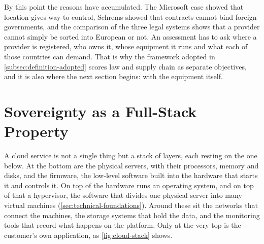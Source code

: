 By this point the reasons have accumulated. The Microsoft case showed that
location gives way to control, Schrems showed that contracts cannot bind foreign
governments, and the comparison of the three legal systems shows that a provider
cannot simply be sorted into European or not. An assessment has to ask where a
provider is registered, who owns it, whose equipment it runs and what each of those
countries can demand. That is why the framework adopted in
\cref{subsec:definition-adopted} scores law and supply chain as separate
objectives, and it is also where the next section begins: with the equipment
itself.

\section{Sovereignty as a Full-Stack Property}
\label{sec:full-stack}

A cloud service is not a single thing but a stack of layers, each resting on the
one below. At the bottom are the physical servers, with their processors, memory
and disks, and the firmware, the low-level software built into the hardware that
starts it and controls it. On top of the hardware runs an operating system, and on
top of that a hypervisor, the software that divides one physical server into many
virtual machines (\cref{sec:technical-foundations}). Around these sit the networks
that connect the machines, the storage systems that hold the data, and the
monitoring tools that record what happens on the platform. Only at the very top
is the customer's own application, as
\cref{fig:cloud-stack} shows.

